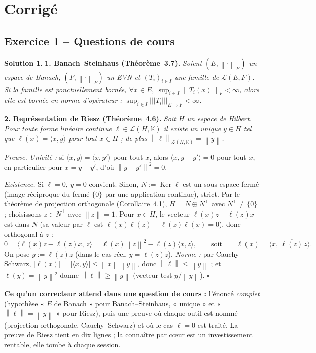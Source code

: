 \documentclass[11pt,a4paper]{article}
\newcommand{\K}{\mathbb{K}}
\newcommand{\norm}[1]{\left\|#1\right\|}
\newcommand{\opnorm}[1]{|\!|\!|#1|\!|\!|}
\newcommand{\Lc}{\mathcal{L}}
\DeclareMathOperator{\Ker}{Ker}
\theoremstyle{definition}
\newtheorem*{solution}{Solution}
\begin{document}
\newpage
\section*{Corrigé}

\subsection*{Exercice 1 -- Questions de cours}

\begin{solution}
\textbf{1. Banach--Steinhaus (Théorème~3.7).} \emph{Soient $(E,\norm\cdot_E)$ un espace de Banach, $(F,\norm\cdot_F)$ un EVN et $(T_i)_{i\in I}$ une famille de $\Lc(E,F)$. Si la famille est ponctuellement bornée, $\forall x\in E,\ \sup_{i\in I}\norm{T_i(x)}_F<\infty$, alors elle est bornée en norme d'opérateur : $\sup_{i\in I}\opnorm{T_i}_{E\to F}<\infty$.}

\textbf{2. Représentation de Riesz (Théorème~4.6).} \emph{Soit $H$ un espace de Hilbert. Pour toute forme linéaire continue $\ell\in\Lc(H,\K)$ il existe un unique $y\in H$ tel que $\ell(x)=\langle x,y\rangle$ pour tout $x\in H$ ; de plus $\norm\ell_{\Lc(H,\K)}=\norm y$.}

\emph{Preuve.} \emph{Unicité :} si $\langle x,y\rangle=\langle x,y'\rangle$ pour tout $x$, alors $\langle x,y-y'\rangle=0$ pour tout $x$, en particulier pour $x=y-y'$, d'où $\norm{y-y'}^2=0$.

\emph{Existence.} Si $\ell=0$, $y=0$ convient. Sinon, $N:=\Ker\ell$ est un sous-espace fermé (image réciproque du fermé $\{0\}$ par une application continue), strict. Par le théorème de projection orthogonale (Corollaire~4.1), $H=N\oplus N^\perp$ avec $N^\perp\ne\{0\}$ ; choisissons $z\in N^\perp$ avec $\norm z=1$. Pour $x\in H$, le vecteur $\ell(x)z-\ell(z)x$ est dans $N$ (sa valeur par $\ell$ est $\ell(x)\ell(z)-\ell(z)\ell(x)=0$), donc orthogonal à $z$ :
\[
0=\langle\ell(x)z-\ell(z)x,\,z\rangle=\ell(x)\norm z^2-\ell(z)\langle x,z\rangle ,
\qquad\text{soit}\qquad \ell(x)=\langle x,\,\overline{\ell(z)}\,z\rangle .
\]
On pose $y:=\overline{\ell(z)}z$ (dans le cas réel, $y=\ell(z)z$). \emph{Norme :} par Cauchy--Schwarz, $|\ell(x)|=|\langle x,y\rangle|\le\norm x\norm y$, donc $\norm\ell\le\norm y$ ; et $\ell(y)=\norm y^2$ donne $\norm\ell\ge\norm y$ (vecteur test $y/\norm y$). \hfill$\square$
\end{solution}

\begin{piege}
\textbf{Ce qu'un correcteur attend dans une question de cours :} l'énoncé \emph{complet} (hypothèse « $E$ de Banach » pour Banach--Steinhaus, « unique » et « $\norm\ell=\norm y$ » pour Riesz), puis une preuve où chaque outil est nommé (projection orthogonale, Cauchy--Schwarz) et où le cas $\ell=0$ est traité. La preuve de Riesz tient en dix lignes ; la connaître par cœur est un investissement rentable, elle tombe à chaque session.
\end{piege}
\end{document}
